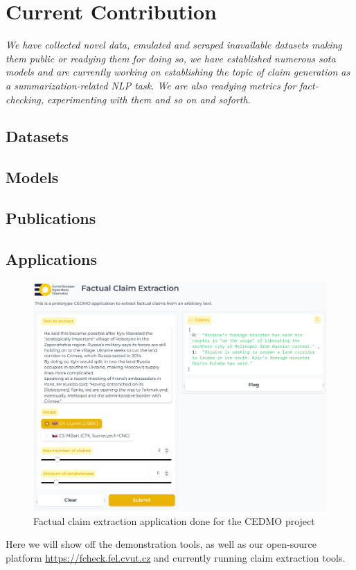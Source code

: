 
\chapter{Current Contribution}
\label{chap:contribution}

\textit{We have collected novel data, emulated and scraped inavailable datasets making them public or readying them for doing so, we have established numerous sota models and are currently working on establishing the topic of claim generation as a summarization-related NLP task.
We are also readying metrics for fact-checking, experimenting with them and so on and soforth.}

\section{Datasets}
\label{sec:pretrain}
\subsection{}
\section{Models}
\label{sec:models}
\section{Publications}
\label{sec:models}
\section{Applications}
\label{sec:models}

\begin{figure}
    \includegraphics[width=16cm]{fig/cedmo.pdf}
    \caption{Factual claim extraction application done for the CEDMO project}
    \label{fig:framework}
\end{figure}

Here we will show off the demonstration tools, as well as our open-source platform \url{https://fcheck.fel.cvut.cz} and currently running claim extraction tools. 